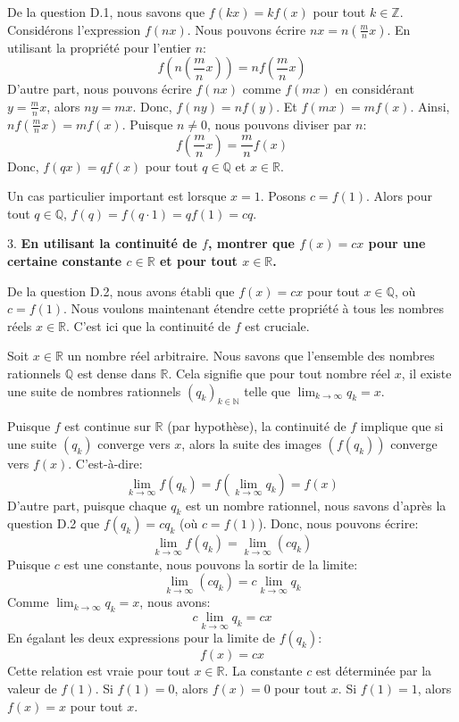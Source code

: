 \documentclass[12pt,a4paper]{report}
\begin{document}
    De la question D.1, nous savons que $f(kx) = kf(x)$ pour tout $k \in \mathbb{Z}$.
    Considérons l'expression $f(nx)$. Nous pouvons écrire $nx = n \left(\frac{m}{n}x\right)$.
    En utilisant la propriété pour l'entier $n$:
    $$ f\left(n \left(\frac{m}{n}x\right)\right) = n f\left(\frac{m}{n}x\right) $$
    D'autre part, nous pouvons écrire $f(nx)$ comme $f(mx)$ en considérant $y = \frac{m}{n}x$, alors $ny = mx$.
    Donc, $f(ny) = nf(y)$.
    Et $f(mx) = mf(x)$.
    Ainsi, $nf\left(\frac{m}{n}x\right) = mf(x)$.
    Puisque $n \neq 0$, nous pouvons diviser par $n$:
    $$ f\left(\frac{m}{n}x\right) = \frac{m}{n}f(x) $$
    Donc, $f(qx) = qf(x)$ pour tout $q \in \mathbb{Q}$ et $x \in \mathbb{R}$.

    Un cas particulier important est lorsque $x=1$. Posons $c = f(1)$.
    Alors pour tout $q \in \mathbb{Q}$, $f(q) = f(q \cdot 1) = qf(1) = cq$.

3.  \textbf{En utilisant la continuité de $f$, montrer que $f(x) = cx$ pour une certaine constante $c \in \mathbb{R}$ et pour tout $x \in \mathbb{R}$.}

    De la question D.2, nous avons établi que $f(x) = cx$ pour tout $x \in \mathbb{Q}$, où $c = f(1)$.
    Nous voulons maintenant étendre cette propriété à tous les nombres réels $x \in \mathbb{R}$. C'est ici que la continuité de $f$ est cruciale.

    Soit $x \in \mathbb{R}$ un nombre réel arbitraire.
    Nous savons que l'ensemble des nombres rationnels $\mathbb{Q}$ est dense dans $\mathbb{R}$. Cela signifie que pour tout nombre réel $x$, il existe une suite de nombres rationnels $(q_k)_{k \in \mathbb{N}}$ telle que $\lim_{k \to \infty} q_k = x$.

    Puisque $f$ est continue sur $\mathbb{R}$ (par hypothèse), la continuité de $f$ implique que si une suite $(q_k)$ converge vers $x$, alors la suite des images $(f(q_k))$ converge vers $f(x)$.
    C'est-à-dire:
    $$ \lim_{k \to \infty} f(q_k) = f\left(\lim_{k \to \infty} q_k\right) = f(x) $$
    D'autre part, puisque chaque $q_k$ est un nombre rationnel, nous savons d'après la question D.2 que $f(q_k) = cq_k$ (où $c = f(1)$).
    Donc, nous pouvons écrire:
    $$ \lim_{k \to \infty} f(q_k) = \lim_{k \to \infty} (cq_k) $$
    Puisque $c$ est une constante, nous pouvons la sortir de la limite:
    $$ \lim_{k \to \infty} (cq_k) = c \lim_{k \to \infty} q_k $$
    Comme $\lim_{k \to \infty} q_k = x$, nous avons:
    $$ c \lim_{k \to \infty} q_k = cx $$
    En égalant les deux expressions pour la limite de $f(q_k)$:
    $$ f(x) = cx $$
    Cette relation est vraie pour tout $x \in \mathbb{R}$.
    La constante $c$ est déterminée par la valeur de $f(1)$. Si $f(1)=0$, alors $f(x)=0$ pour tout $x$. Si $f(1)=1$, alors $f(x)=x$ pour tout $x$.
\end{document}
